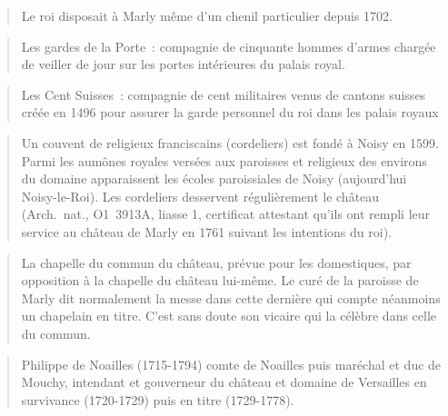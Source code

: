 \documentclass[11pt,twoside]{article}\makeatletter
\begin{document}
\begin{quote}
Le roi disposait à Marly même d’un chenil particulier depuis 1702.\end{quote}

\begin{quote}
Les gardes de la Porte : compagnie de cinquante hommes d’armes chargée de veiller de jour sur les portes intérieures du palais royal.\end{quote}

\begin{quote}
Les Cent Suisses : compagnie de cent militaires venus de cantons suisses créée en 1496 pour assurer la garde personnel du roi dans les palais royaux\end{quote}

\begin{quote}
Un couvent de religieux franciscains (cordeliers) est fondé à Noisy en 1599. Parmi les aumônes royales versées aux paroisses et religieux des environs du domaine apparaissent les écoles paroissiales de Noisy (aujourd’hui Noisy-le-Roi). Les cordeliers desservent régulièrement le château (Arch. nat., O1 3913A, liasse 1, certificat attestant qu’ils ont rempli leur service au château de Marly en 1761 suivant les intentions du roi).\end{quote}

\begin{quote}
La chapelle du commun du château, prévue pour les domestiques, par opposition à la chapelle du château lui-même. Le curé de la paroisse de Marly dit normalement la messe dans cette dernière qui compte néanmoins un chapelain en titre. C’est sans doute son vicaire qui la célèbre dans celle du commun.\end{quote}

\begin{quote}
Philippe de Noailles (1715-1794) comte de Noailles puis maréchal et duc de Mouchy, intendant et gouverneur du château et domaine de Versailles en survivance (1720-1729) puis en titre (1729-1778).\end{quote}
\end{document}
